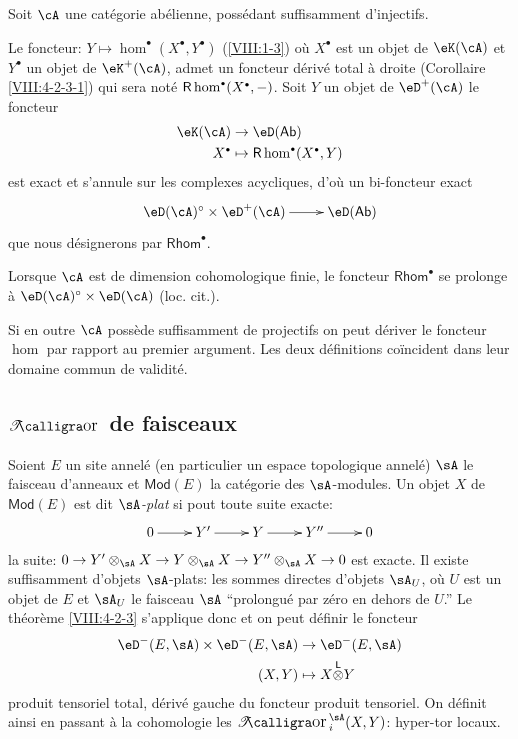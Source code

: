 Soit $\cA$ une catégorie abélienne, possédant suffisamment d'injectifs. 

Le foncteur: $Y\mapsto \hom^\bullet(X^\bullet,Y^\bullet)$ (\ref{VIII:1-3}) 
où $X^\bullet$ est un objet de $\eK(\cA)$ et $Y^\bullet$ un objet de 
$\eK^+(\cA)$, admet un foncteur dérivé total à droite 
(Corollaire \ref{VIII:4-2-3-1}) qui sera noté $\rhom^\bullet(X^\bullet,-)$.  
Soit $Y$ un objet de $\eD^+(\cA)$ le foncteur 
\begin{align*}
  \eK(\cA) &\to \eD(\mathsf{Ab}) \\
  X^\bullet &\mapsto \rhom^\bullet(X^\bullet,Y) 
\end{align*}
est exact et s'annule sur les complexes acycliques, d'où un bi-foncteur 
exact 
\[\xymatrix{
  \eD(\cA)^\circ \times \eD^+(\cA) \ar[r] 
    & \eD(\mathsf{Ab}) 
}\]
que nous désignerons par $\mathsf{Rhom}^\bullet$. 

Lorsque $\cA$ est de dimension cohomologique finie, le foncteur 
$\mathsf{Rhom}^\bullet$ se prolonge à $\eD(\cA)^\circ\times \eD(\cA)$ 
(loc. cit.). 

Si en outre $\cA$ possède suffisamment de projectifs on peut dériver le 
foncteur $\hom$ par rapport au premier argument. Les deux définitions 
co\"incident dans leur domaine commun de validité. 










\subsection{\texorpdfstring{$\Tor$}{Tor} de faisceaux}\label{VIII:6-2}

Soient $E$ un site annelé (en particulier un espace topologique annelé) 
$\sA$ le faisceau d'anneaux et $\mathsf{Mod}(E)$ la catégorie des 
$\sA$-modules. Un objet $X$ de $\mathsf{Mod}(E)$ est dit 
\emph{$\sA$-plat} si pout toute suite exacte: 
\[\xymatrix{
  0 \ar[r] 
    & Y' \ar[r] 
    & Y \ar[r] 
    & Y'' \ar[r] 
    & 0 
}\]
la suite: $0 \to Y'\otimes_\sA X \to Y\otimes_\sA X \to Y''\otimes_\sA X\to 0$ 
est exacte. Il existe suffisamment d'objets $\sA$-plats: les sommes directes 
d'objets $\sA_U$, où $U$ est un objet de $E$ et $\sA_U$ le faisceau 
$\sA$ ``prolongué par zéro en dehors de $U$.'' Le théorème 
\ref{VIII:4-2-3} s'applique donc et on peut définir le foncteur 
\begin{align*}
  \eD^-(E,\sA) \times \eD^-(E,\sA) &\to \eD^-(E,\sA) \\
  (X,Y) &\mapsto X\lotimes Y 
\end{align*}
produit tensoriel total, dérivé gauche du foncteur produit tensoriel. 
On définit ainsi en passant à la cohomologie les $\Tor_i^\sA(X,Y)$: 
hyper-tor locaux. 

